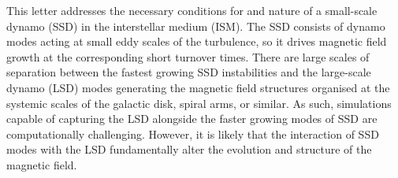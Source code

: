 \documentclass[preprint2]{aastex63}
\begin{document}

This letter addresses the necessary conditions for and nature of a small-scale
dynamo (SSD) in the interstellar medium (ISM).
The SSD consists of dynamo modes acting at small eddy scales of the
turbulence, so it drives magnetic field growth at the corresponding short
turnover times.
There are large scales of separation between the fastest growing SSD
instabilities and the large-scale dynamo (LSD) modes generating the magnetic
field structures organised at the systemic scales of the galactic disk, spiral
arms, or similar.
As such, simulations capable of capturing the LSD alongside the faster
growing modes of SSD are computationally challenging.
However, it is likely that the interaction of SSD modes with the LSD
fundamentally alter the evolution and structure of the magnetic field.
\end{document}
